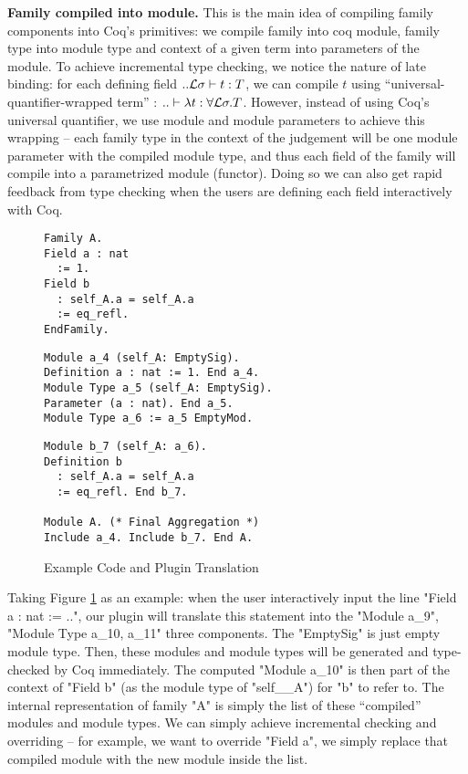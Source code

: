 \textbf{Family compiled into module.} This is the main idea of compiling family components into Coq's primitives: we compile family into coq module, family type into module type and context of a given term into parameters of the module. To achieve incremental type checking, we notice the nature of late binding: for each defining field $ .. {\mathcal{L}}\sigma \vdash t : T $, we can compile $t$ using ``universal-quantifier-wrapped term'' : $.. \vdash \lambda t : \forall {\mathcal{L}} \sigma. T$. However, instead of using Coq's universal quantifier, we use module and module parameters to achieve this wrapping -- each family type in the context of the judgement will be one module parameter with the compiled module type, and thus each field of the family will compile into a parametrized module (functor). Doing so we can also get rapid feedback from type checking when the users are defining each field interactively with Coq.
\begin{figure}
  \begin{minipage}[t]{0.25\linewidth}
\begin{verbatim}
Family A.
Field a : nat 
  := 1.
Field b 
  : self_A.a = self_A.a
  := eq_refl.
EndFamily.
\end{verbatim}
  \end{minipage}
  \begin{minipage}[t]{0.4\linewidth}
\begin{verbatim}
Module a_4 (self_A: EmptySig).
Definition a : nat := 1. End a_4.
Module Type a_5 (self_A: EmptySig).
Parameter (a : nat). End a_5.
Module Type a_6 := a_5 EmptyMod.
\end{verbatim}
  \end{minipage}
  \begin{minipage}[t]{0.3\linewidth}
\begin{verbatim}
Module b_7 (self_A: a_6).
Definition b 
  : self_A.a = self_A.a 
  := eq_refl. End b_7.
  
Module A. (* Final Aggregation *)
Include a_4. Include b_7. End A.
\end{verbatim}
  \end{minipage}
  \caption{Example Code and Plugin Translation}\label{fig:plugin-example1}
\end{figure}


Taking Figure \ref*{fig:plugin-example1} as an example: when the user interactively input the line "Field a : nat := ..", our plugin will translate this statement into the "Module a_9", "Module Type a_10, a_11" three components. {The "EmptySig" is just empty module type.} Then, these modules and module types will be generated and type-checked by Coq immediately. The computed "Module a_10" is then part of the context of "Field b" (as the module type of "self__A") for "b" to refer to. The internal representation of family "A" is simply the list of these ``compiled'' modules and module types. We can simply achieve incremental checking and overriding -- for example, we want to override "Field a", we simply replace that compiled module with the new module inside the list. 

